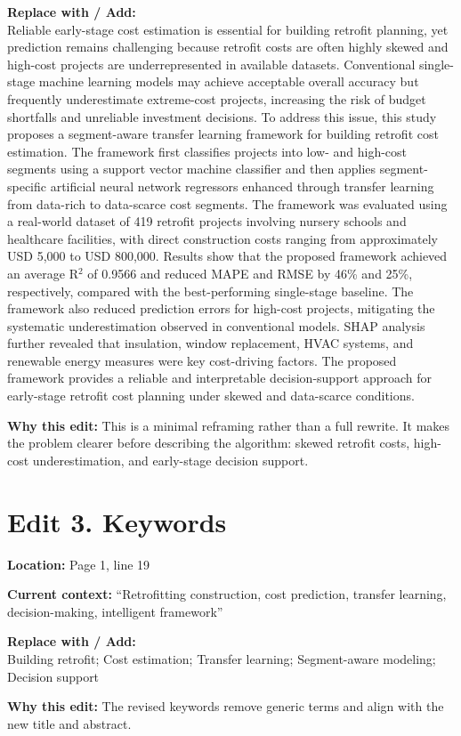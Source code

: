 \documentclass[11pt]{article}
\newcommand{\loc}[1]{\textbf{Location:} #1}
\newcommand{\current}[1]{\textbf{Current context:} #1}
\newcommand{\replacewith}[1]{\textbf{Replace with / Add:}\\{\color{blue}#1}}
\newcommand{\why}[1]{\textbf{Why this edit:} #1}
\begin{document}
\replacewith{Reliable early-stage cost estimation is essential for building retrofit planning, yet prediction remains challenging because retrofit costs are often highly skewed and high-cost projects are underrepresented in available datasets. Conventional single-stage machine learning models may achieve acceptable overall accuracy but frequently underestimate extreme-cost projects, increasing the risk of budget shortfalls and unreliable investment decisions. To address this issue, this study proposes a segment-aware transfer learning framework for building retrofit cost estimation. The framework first classifies projects into low- and high-cost segments using a support vector machine classifier and then applies segment-specific artificial neural network regressors enhanced through transfer learning from data-rich to data-scarce cost segments. The framework was evaluated using a real-world dataset of 419 retrofit projects involving nursery schools and healthcare facilities, with direct construction costs ranging from approximately USD 5,000 to USD 800,000. Results show that the proposed framework achieved an average R$^2$ of 0.9566 and reduced MAPE and RMSE by 46\% and 25\%, respectively, compared with the best-performing single-stage baseline. The framework also reduced prediction errors for high-cost projects, mitigating the systematic underestimation observed in conventional models. SHAP analysis further revealed that insulation, window replacement, HVAC systems, and renewable energy measures were key cost-driving factors. The proposed framework provides a reliable and interpretable decision-support approach for early-stage retrofit cost planning under skewed and data-scarce conditions.}

\why{This is a minimal reframing rather than a full rewrite. It makes the problem clearer before describing the algorithm: skewed retrofit costs, high-cost underestimation, and early-stage decision support.}

\section*{Edit 3. Keywords}
\loc{Page 1, line 19}

\current{``Retrofitting construction, cost prediction, transfer learning, decision-making, intelligent framework''}

\replacewith{Building retrofit; Cost estimation; Transfer learning; Segment-aware modeling; Decision support}

\why{The revised keywords remove generic terms and align with the new title and abstract.}
\end{document}
